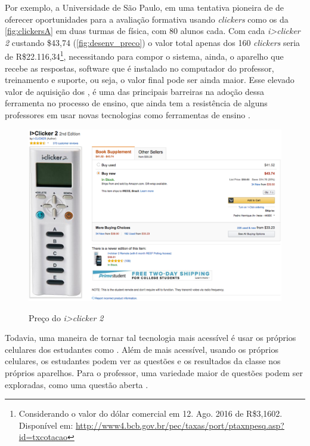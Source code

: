 Por exemplo, a Universidade de São Paulo, em uma tentativa pioneira de
 de oferecer oportunidades para a avaliação
formativa usando \textit{clickers} como os da \autoref{fig:clickersA} em duas
turmas de física, com 80 alunos cada. Com cada \textit{i>clicker 2}
custando \$43,74 (\autoref{fig:desenv_preco})
o valor total apenas dos 160 \textit{clickers} seria de
R\$22.116,34\footnote{Considerando o valor do dólar comercial em 12. Ago. 2016
de R\$3,1602. Disponível em: \href{http://www4.bcb.gov.br/pec/taxas/port/ptaxnpesq.asp?id=txcotacao}{http://www4.bcb.gov.br/pec/taxas/port/ptaxnpesq.asp?id=txcotacao}},
necessitando para compor o sistema, ainda, o aparelho que recebe as respostas, software que é instalado
no computador do professor, treinamento e suporte, ou seja, o valor final pode ser
ainda maior. Esse elevado valor de aquisição dos {\clickers}, é uma das principais barreiras na adoção dessa
ferramenta no processo de ensino, que ainda tem a resistência de alguns professores
em usar novas tecnologias como ferramentas de ensino \cite{Moratelli2014, Blasco-Arcas2013, Strasser2010, GerdKortemeyerEmersonCruz2011, Kay2009}.

\begin{figure}[!t]
  \centering
  \caption{Preço do \textit{i>clicker 2}}
  \includegraphics[width=.75\textwidth]{imagens/desenv_preco}
  \label{fig:desenv_preco}
\end{figure}

Todavia, uma maneira de tornar tal tecnologia mais acessível é usar os próprios
celulares dos estudantes como {\clickers} \cite{Stowell2015, Morrell2015, Araujo2013}.
Além de mais acessível, usando os próprios celulares, os estudantes podem
ver as questões e os resultados da classe nos próprios aparelhos. Para o professor,
uma variedade maior de questões podem ser exploradas, como uma  questão aberta \cite{Stowell2015}.

